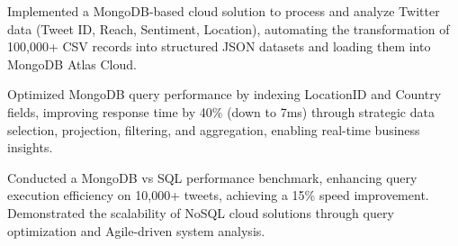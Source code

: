 \vspace{4pt}
\begin{tightemize}
    \item Implemented a MongoDB-based cloud solution to process and analyze Twitter data (Tweet ID, Reach, Sentiment, Location), automating the transformation of 100,000+ CSV records into structured JSON datasets and loading them into MongoDB Atlas Cloud.
    \item Optimized MongoDB query performance by indexing LocationID and Country fields, improving response time by 40\% (down to 7ms) through strategic data selection, projection, filtering, and aggregation, enabling real-time business insights.
    \item Conducted a MongoDB vs SQL performance benchmark, enhancing query execution efficiency on 10,000+ tweets, achieving a 15\% speed improvement. Demonstrated the scalability of NoSQL cloud solutions through query optimization and Agile-driven system analysis.
\end{tightemize}
